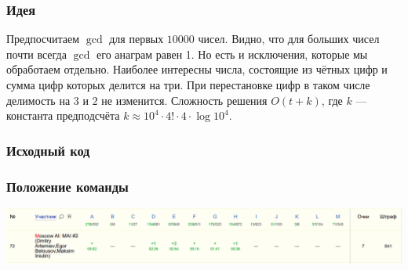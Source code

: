 \subsubsection*{Идея}
Предпосчитаем $\gcd$ для первых $10000$ чисел. Видно, что для больших чисел почти всегда $\gcd$ его анаграм равен 1. Но есть и исключения, которые мы обработаем отдельно. Наиболее интересны числа, состоящие из чётных цифр и сумма цифр которых делится на три. При перестановке цифр в таком числе делимость на $3$ и $2$ не изменится. Сложность решения $O(t +k)$, где $k$ --- константа предподсчёта $k \approx 10 ^ 4 \cdot 4! \cdot 4 \cdot \log{10 ^ 4}$.
\subsubsection*{Исходный код}

\subsubsection*{Положение команды}
\includegraphics[scale=0.25]{images/moscow_regional.png}\newline\noindent
\pagebreak
